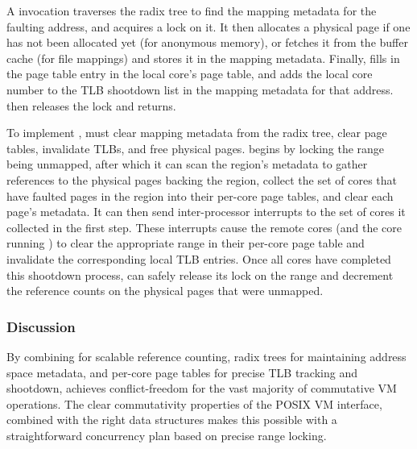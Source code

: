 A  invocation traverses the radix tree to find the
mapping metadata for the faulting address, and acquires a lock on it.
It then allocates a physical page if one has not been allocated yet
(for anonymous memory), or fetches it from the buffer cache (for file
mappings) and
stores it in the mapping metadata.  Finally,  fills in the
page table entry in the local core's page table, and adds the local core
number to the TLB shootdown list in the mapping metadata for that address.
 then releases the lock and returns.

To implement , \vm must clear mapping metadata from the
radix tree, clear page tables, invalidate TLBs, and free physical
pages.   begins by locking the range being unmapped,
after which it can scan the region's metadata to gather references to
the physical pages backing the region, collect the set of cores that
have faulted pages in the region into their per-core page tables, and
clear each page's metadata.  It can then send inter-processor
interrupts to the set of cores it collected in the first step.  These
interrupts cause the remote cores (and the core running )
to clear the appropriate range in their per-core page table and
invalidate the corresponding local TLB entries.  Once all cores have
completed this shootdown process,  can safely release its
lock on the range and decrement the reference counts on the physical
pages that were unmapped.


\subsubsection{Discussion}

By combining  for scalable reference counting, radix trees
for maintaining address space metadata, and per-core page tables for
precise TLB tracking and shootdown, \vm achieves conflict-freedom for
the vast majority of commutative VM operations.  The clear
commutativity properties of the POSIX VM interface, combined with the
right data structures makes this possible with a straightforward
concurrency plan based on precise range locking.

